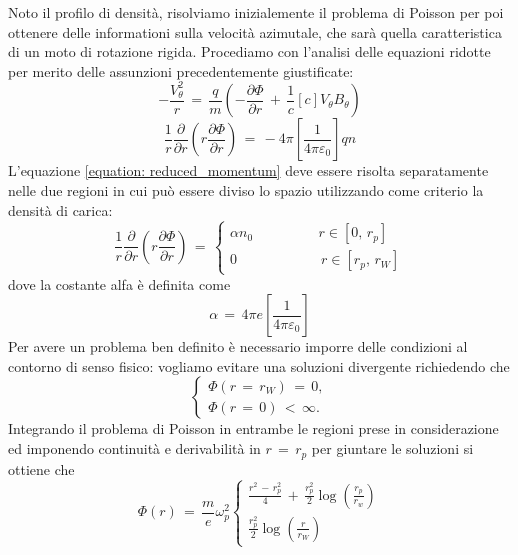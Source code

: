 Noto il profilo di densità, risolviamo inizialemente il problema di Poisson per poi ottenere delle informationi 
sulla velocità azimutale, che sarà quella caratteristica di un moto di rotazione rigida. Procediamo con l'analisi delle equazioni 
ridotte per merito delle assunzioni precedentemente giustificate:
\begin{equation}
    -\frac{V_\theta^2}{r}\,=\,\frac{q}{m}\left(-\frac{\partial \Phi}{\partial r}\,+\,\frac{1}{c}\left[c\right]V_\theta B_\theta\right)
    \label{equation: reduced_Poisson}
\end{equation}
\begin{equation}
    \frac{1}{r}\frac{\partial}{\partial r}\left(r\frac{\partial \Phi}{\partial r}\right)\,=\,-4\pi\left[\frac{1}{4\pi\varepsilon_0}\right]qn
    \label{equation: reduced_momentum}
\end{equation}
L'equazione \eqref{equation: reduced_momentum} deve essere risolta separatamente nelle due regioni in cui può essere diviso lo spazio 
utilizzando come criterio la densità di carica:
\begin{equation}
    \frac{1}{r}\frac{\partial}{\partial r}\left(r\frac{\partial \Phi}{\partial r}\right)\,=\,
    \begin{cases}
        \alpha n_0 \,\,\,\, \qquad \qquad r \in \left[0,\,r_p\right] \\
        0 \qquad \qquad \qquad r \in \left[r_p,\,r_W\right]
    \end{cases}
    \label{equation: Poisson_step1}
\end{equation}
dove la costante alfa è definita come
\begin{equation}
    \alpha\,=\,4\pi e\left[\frac{1}{4\pi\varepsilon_0}\right]
\end{equation}
Per avere un problema ben definito è necessario imporre delle condizioni al contorno di senso fisico: vogliamo evitare una 
soluzioni divergente richiedendo che
\begin{equation}
    \begin{cases}
    \Phi \left(r\,=\,r_W\right)\,=\,0, \\
    \Phi \left(r\,=\,0\right)\,<\,\infty.
    \end{cases}
    \label{equation: BC}
\end{equation}
Integrando il problema di Poisson in entrambe le regioni prese in considerazione ed imponendo continuità e derivabilità in 
$r\,=\,r_p$ per giuntare le soluzioni si ottiene che
\begin{equation}
    \Phi\left(r\right)\,=\,\frac{m}{e}\omega_p^2
    \begin{cases}
        \frac{r^2\,-\,r_p^2}{4}\,+\,\frac{r_p^2}{2}\log{\left(\frac{r_p}{r_w}\right)}   \\
        \frac{r_p^2}{2}\log{\left(\frac{r}{r_W}\right)}
    \end{cases}
    \label{equation: potential_solution}
\end{equation}
